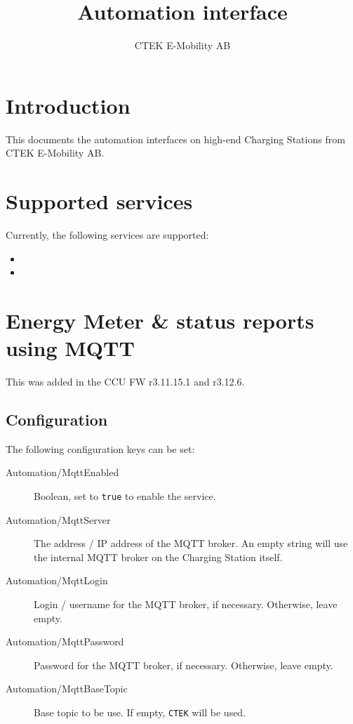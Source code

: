 \documentclass{scrartcl}
\title{Automation interface}
\subtitle{}
\author{CTEK E-Mobility AB}
\begin{document}
\maketitle
\section*{Introduction}
This documents the automation interfaces on high-end Charging Stations from
CTEK E-Mobility AB.

\tableofcontents

\newpage
\section{Supported services}
\label{sec:supported-services}

Currently, the following services are supported:
\begin{itemize}
\item {}
\item {}
\end{itemize}


\section{Energy Meter \& status reports using MQTT}
\label{sec:energy-meter-status-mqtt}

This was added in the CCU FW r3.11.15.1 and r3.12.6.

\subsection{Configuration}
\label{sec:em-status-configuration}

The following configuration keys can be set:
\begin{description}
\item[Automation/MqttEnabled] Boolean, set to \verb|true| to enable the service.
\item[Automation/MqttServer] The address / IP address of the MQTT broker. An
  empty string will use the internal MQTT broker on the Charging Station
  itself.
\item[Automation/MqttLogin] Login / username for the MQTT broker, if
  necessary. Otherwise, leave empty.
\item[Automation/MqttPassword] Password for the MQTT broker, if
  necessary. Otherwise, leave empty.
\item[Automation/MqttBaseTopic] Base topic to be use. If empty, \verb|CTEK|
  will be used.
\end{description}
\end{document}
